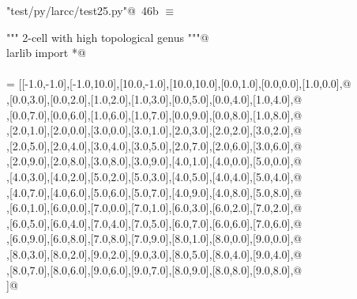 \documentclass[11pt,oneside]{article}    %
\begin{document}
\begin{flushleft} \small \label{scrap78}
\protect{}\verb@"test/py/larcc/test25.py"@\nobreak\ {\footnotesize 46b }$\equiv$
\vspace{-1ex}
\begin{list}{}{} \item
\mbox{}\verb@""" 2-cell with high topological genus """@\\
\mbox{}\verb@from larlib import *@\\
\mbox{}\verb@@\\
\mbox{}\verb@V = [[-1.0,-1.0],[-1.0,10.0],[10.0,-1.0],[10.0,10.0],[0.0,1.0],[0.0,0.0],[1.0,0.0],@\\
\mbox{}\verb@[1.0,1.0],[0.0,3.0],[0.0,2.0],[1.0,2.0],[1.0,3.0],[0.0,5.0],[0.0,4.0],[1.0,4.0],@\\
\mbox{}\verb@[1.0,5.0],[0.0,7.0],[0.0,6.0],[1.0,6.0],[1.0,7.0],[0.0,9.0],[0.0,8.0],[1.0,8.0],@\\
\mbox{}\verb@[1.0,9.0],[2.0,1.0],[2.0,0.0],[3.0,0.0],[3.0,1.0],[2.0,3.0],[2.0,2.0],[3.0,2.0],@\\
\mbox{}\verb@[3.0,3.0],[2.0,5.0],[2.0,4.0],[3.0,4.0],[3.0,5.0],[2.0,7.0],[2.0,6.0],[3.0,6.0],@\\
\mbox{}\verb@[3.0,7.0],[2.0,9.0],[2.0,8.0],[3.0,8.0],[3.0,9.0],[4.0,1.0],[4.0,0.0],[5.0,0.0],@\\
\mbox{}\verb@[5.0,1.0],[4.0,3.0],[4.0,2.0],[5.0,2.0],[5.0,3.0],[4.0,5.0],[4.0,4.0],[5.0,4.0],@\\
\mbox{}\verb@[5.0,5.0],[4.0,7.0],[4.0,6.0],[5.0,6.0],[5.0,7.0],[4.0,9.0],[4.0,8.0],[5.0,8.0],@\\
\mbox{}\verb@[5.0,9.0],[6.0,1.0],[6.0,0.0],[7.0,0.0],[7.0,1.0],[6.0,3.0],[6.0,2.0],[7.0,2.0],@\\
\mbox{}\verb@[7.0,3.0],[6.0,5.0],[6.0,4.0],[7.0,4.0],[7.0,5.0],[6.0,7.0],[6.0,6.0],[7.0,6.0],@\\
\mbox{}\verb@[7.0,7.0],[6.0,9.0],[6.0,8.0],[7.0,8.0],[7.0,9.0],[8.0,1.0],[8.0,0.0],[9.0,0.0],@\\
\mbox{}\verb@[9.0,1.0],[8.0,3.0],[8.0,2.0],[9.0,2.0],[9.0,3.0],[8.0,5.0],[8.0,4.0],[9.0,4.0],@\\
\mbox{}\verb@[9.0,5.0],[8.0,7.0],[8.0,6.0],[9.0,6.0],[9.0,7.0],[8.0,9.0],[8.0,8.0],[9.0,8.0],@\\
\mbox{}\verb@[9.0,9.0]]@\\
\mbox{}\verb@@\\

\end{list}
\end{flushleft}
\end{document}
